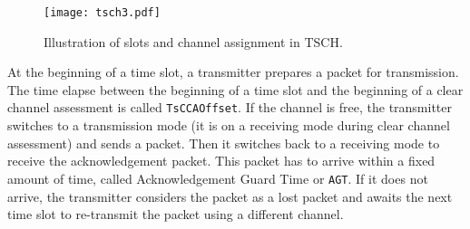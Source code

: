 \begin{figure*}[t!]
	\centering
	\texttt{[image: tsch3.pdf]}
	\caption{Illustration of slots and channel assignment in TSCH.}
	\label{fig:tsch3}
\end{figure*}

At the beginning of a time slot, a transmitter prepares a packet for transmission. The time elapse between the beginning of a time slot and the beginning of a clear channel assessment is called \texttt{TsCCAOffset}. If the channel is free, the transmitter switches to a transmission mode (it is on a receiving mode during clear channel assessment) and sends a packet. Then it switches back to a receiving mode to receive the acknowledgement packet. This packet has to arrive within a fixed amount of time, called Acknowledgement Guard Time or \texttt{AGT}. If it does not arrive, the transmitter considers the packet as a lost packet and awaits the next time slot to re-transmit the packet using a different channel.

 
